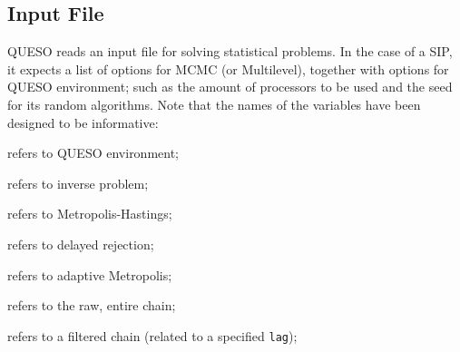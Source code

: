 






 


\subsection{Input File}\label{sec:sip-input-file}


QUESO reads an input file for solving statistical problems. In the case of a SIP, it expects a list of options for MCMC (or Multilevel),
together with options for QUESO environment; such as the amount of processors to be used and the seed for its random algorithms.
Note that the names of the variables have been designed to be informative:
\begin{description}\vspace{-8pt}
\item[ \texttt{env}:] refers to QUESO environment; \vspace{-8pt}
\item[ \texttt{ip}:] refers to inverse problem;\vspace{-8pt}
\item[ \texttt{mh}:] refers to Metropolis-Hastings;\vspace{-8pt}
\item[ \texttt{dr}:] refers to delayed rejection;\vspace{-8pt}
\item[ \texttt{am}:] refers to adaptive Metropolis;\vspace{-8pt}
\item[ \texttt{rawChain}:] refers to the raw, entire chain; \vspace{-8pt}
\item[ \texttt{filteredChain}:] refers to a filtered chain (related to a specified \texttt{lag});\vspace{-8pt}
\end{description}


